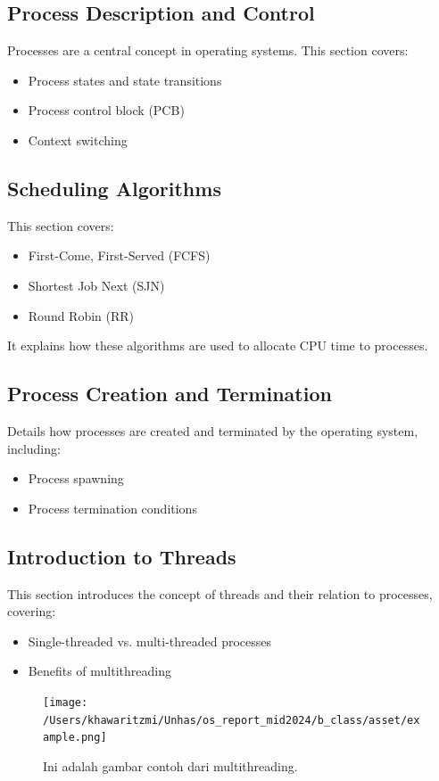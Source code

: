 \documentclass[12pt]{article}
\begin{document}
\subsection{Process Description and Control}
Processes are a central concept in operating systems. This section covers:
\begin{itemize}
    \item Process states and state transitions
    \item Process control block (PCB)
    \item Context switching
\end{itemize}

\subsection{Scheduling Algorithms}
This section covers:
\begin{itemize}
    \item First-Come, First-Served (FCFS)
    \item Shortest Job Next (SJN)
    \item Round Robin (RR)
\end{itemize}
It explains how these algorithms are used to allocate CPU time to processes.

\subsection{Process Creation and Termination}
Details how processes are created and terminated by the operating system, including:
\begin{itemize}
    \item Process spawning
    \item Process termination conditions
\end{itemize}

\subsection{Introduction to Threads}
This section introduces the concept of threads and their relation to processes, covering:
\begin{itemize}
    \item Single-threaded vs. multi-threaded processes
    \item Benefits of multithreading
\end{itemize}

\begin{figure}[h]
    \centering
    \texttt{[image: /Users/khawaritzmi/Unhas/os\_report\_mid2024/b\_class/asset/example.png]}  %
    \caption{Ini adalah gambar contoh dari multithreading.}
    \label{fig:contoh_gambar}
\end{figure}
\end{document}
